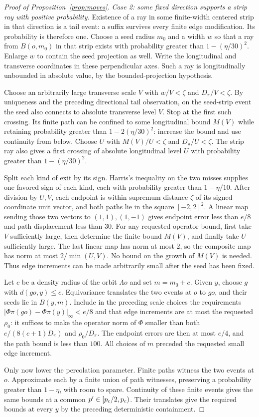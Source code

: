 \begin{proof}[Proof of Proposition~\ref{prop:moves}]
\emph{Case 2: some fixed direction supports a strip ray with positive
probability.} Existence of a ray in some finite-width centered strip
in that direction is a tail event: a suffix survives every finite
edge modification. Its probability is therefore one. Choose a seed
radius $m_0$ and a width $w$ so that a ray from $B(o,m_0)$ in that
strip exists with probability greater than $1-(\eta/30)^2$.
Enlarge $w$ to contain the seed projection as well. Write the
longitudinal and transverse coordinates in these perpendicular axes.
Such a ray is longitudinally unbounded in absolute value, by the
bounded-projection hypothesis.

Choose an arbitrarily large transverse scale $V$ with
$w/V<\zeta$ and $D_\pi/V<\zeta$.
By uniqueness and the preceding directional tail observation, on
the seed-strip event the seed also connects to absolute transverse
level $V$. Stop at the first such crossing. Its finite path can be
confined to some longitudinal bound $M(V)$ while retaining probability
greater than $1-2(\eta/30)^2$: increase the bound and use continuity
from below. Choose $U$ with $M(V)/U<\zeta$ and $D_\pi/U<\zeta$.
The strip ray also gives a
first crossing of absolute longitudinal level $U$ with probability
greater than $1-(\eta/30)^2$.

Split each kind of exit by its sign. Harris's inequality on the two
misses supplies one favored sign of each kind, each with probability
greater than $1-\eta/10$. After division by $U,V$, each endpoint is
within supremum distance $\zeta$ of its signed coordinate unit vector,
and both paths lie in the square $[-2,2]^2$.
A linear map sending those two vectors to $(1,1),(1,-1)$ gives
endpoint error less than $e/8$ and path displacement less than $30$.
For any requested operator bound, first take $V$ sufficiently large,
then determine the finite bound $M(V)$, and finally take $U$ sufficiently
large. The last linear map has norm at most $2$, so the composite map
has norm at most $2/\min(U,V)$. No bound on the growth of $M(V)$ is
needed. Thus edge increments can be made arbitrarily small after
the seed has been fixed.

Let $c$ be a density radius of the orbit $\Lambda o$ and set
$m=m_0+c$. Given $y$, choose $g$ with $d(go,y)\le c$.
Equivariance translates the two events at $o$ to $go$, and their seeds
lie in $B(y,m)$. Include in the preceding scale choices the requirements
$|\Phi\pi(go)-\Phi\pi(y)|_\infty<e/8$ and that edge increments
are at most the requested $\rho_0$: it suffices to make the operator norm
of $\Phi$ smaller than both $e/(8(c+1)D_\pi)$ and $\rho_0/D_\pi$.
The endpoint errors are then at
most $e/4$, and the path bound is less than $100$. All choices of
$m$ preceded the requested small edge increment.

Only now lower the percolation parameter. Finite paths witness the
two events at $o$. Approximate each by a finite union of path witnesses,
preserving a probability greater than $1-\eta$, with room to spare.
Continuity of these finite events gives the same bounds at a common
$p'\in[p_c/2,p_c)$. Their translates give the required bounds at
every $y$ by the preceding deterministic containment.
\end{proof}
